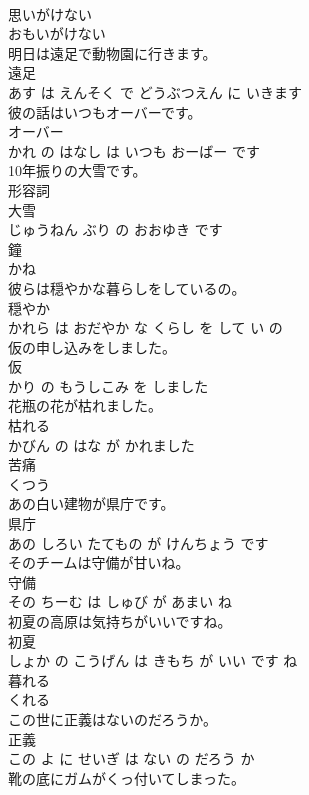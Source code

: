 \documentclass[8pt]{extreport}
\begin{document}
\begin{CJK}{UTF8}{min}
\\	思いがけない	
\\	おもいがけない			
\\	明日は遠足で動物園に行きます。	
\\	遠足 
\\	あす は えんそく で どうぶつえん に いきます			
\\	彼の話はいつもオーバーです。	
\\	オーバー 
\\	かれ の はなし は いつも おーばー です			
\\	10年振りの大雪です。	
\\	形容詞 
\\	大雪 
\\	じゅうねん ぶり の おおゆき です			
\\	鐘	
\\	かね			
\\	彼らは穏やかな暮らしをしているの。	
\\	穏やか 
\\	かれら は おだやか な くらし を して い の			
\\	仮の申し込みをしました。	
\\	仮 
\\	かり の もうしこみ を しました			
\\	花瓶の花が枯れました。	
\\	枯れる 
\\	かびん の はな が かれました			
\\	苦痛	
\\	くつう			
\\	あの白い建物が県庁です。	
\\	県庁 
\\	あの しろい たてもの が けんちょう です			
\\	そのチームは守備が甘いね。	
\\	守備 
\\	その ちーむ は しゅび が あまい ね			
\\	初夏の高原は気持ちがいいですね。	
\\	初夏 
\\	しょか の こうげん は きもち が いい です ね			
\\	暮れる	
\\	くれる			
\\	この世に正義はないのだろうか。	
\\	正義 
\\	この よ に せいぎ は ない の だろう か			
\\	靴の底にガムがくっ付いてしまった。	

\end{CJK}
\end{document}
